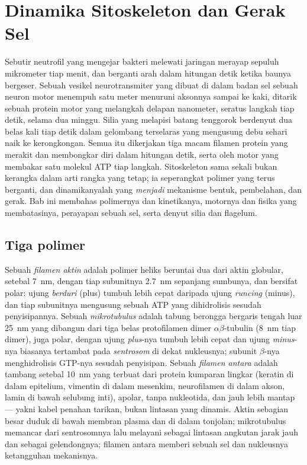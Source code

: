\chapter{Dinamika Sitoskeleton dan Gerak Sel}\label{ch:b3:cytoskeleton-motility}

Sebutir neutrofil yang mengejar bakteri melewati jaringan merayap sepuluh
mikrometer tiap menit, dan berganti arah dalam hitungan detik ketika baunya
bergeser. Sebuah vesikel neurotransmiter yang dibuat di dalam badan sel sebuah
neuron motor menempuh satu meter menuruni aksonnya sampai ke kaki, ditarik
sebuah protein motor yang melangkah delapan nanometer, seratus langkah tiap
detik, selama dua minggu. Silia yang melapisi batang tenggorok berdenyut dua
belas kali tiap detik dalam gelombang terselaras yang mengusung debu sehari
naik ke kerongkongan. Semua itu dikerjakan tiga macam filamen protein yang
merakit dan membongkar diri dalam hitungan detik, serta oleh motor yang
membakar satu molekul ATP tiap langkah. Sitoskeleton sama sekali bukan
kerangka dalam arti rangka yang tetap; ia seperangkat polimer yang terus
berganti, dan dinamikanyalah yang \emph{menjadi} mekanisme bentuk, pembelahan,
dan gerak. Bab ini membahas polimernya dan kinetikanya, motornya dan fisika
yang membatasinya, perayapan sebuah sel, serta denyut silia dan flagelum.

\section{Tiga polimer}

\begin{definition}\label{def:b3:cytoskeleton-motility:filaments}
%
Sebuah \emph{filamen aktin} adalah polimer heliks beruntai dua dari aktin
globular, setebal \qty{7}{nm}, dengan tiap subunitnya \qty{2.7}{nm} sepanjang
sumbunya, dan bersifat polar: ujung \emph{berduri} (plus) tumbuh lebih cepat
daripada ujung \emph{runcing} (minus), dan tiap subunitnya mengusung sebuah ATP
yang dihidrolisis sesudah penyisipannya. Sebuah \emph{mikrotubulus} adalah
tabung berongga bergaris tengah luar \qty{25}{nm} yang dibangun dari tiga belas
protofilamen dimer $\alpha\beta$-tubulin (\qty{8}{nm} tiap dimer), juga polar,
dengan ujung \emph{plus}-nya tumbuh lebih cepat dan ujung \emph{minus}-nya
biasanya tertambat pada \emph{sentrosom} di dekat nukleusnya; subunit
$\beta$-nya menghidrolisis GTP-nya sesudah penyisipan. Sebuah \emph{filamen
antara} adalah tambang setebal \qty{10}{nm} yang terbuat dari protein kumparan
lingkar (keratin di dalam epitelium, vimentin di dalam mesenkim, neurofilamen
di dalam akson, lamin di bawah selubung inti), apolar, tanpa nukleotida, dan
jauh lebih mantap --- yakni kabel penahan tarikan, bukan lintasan yang dinamis.
Aktin sebagian besar duduk di bawah membran plasma dan di dalam tonjolan;
mikrotubulus memancar dari sentrosomnya lalu melayani sebagai lintasan
angkutan jarak jauh dan sebagai gelendongnya; filamen antara memberi sebuah sel
dan nukleusnya ketangguhan mekanisnya.
\end{definition}

